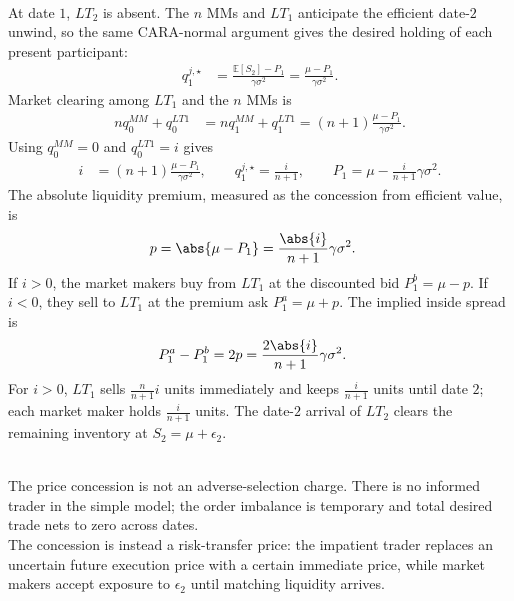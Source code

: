 \begin{model}
\par\smallskip\noindent{}\\
At date $1$, $LT_2$ is absent. The $n$ MMs and $LT_1$ anticipate the efficient date-$2$ unwind, so the same CARA-normal argument gives the desired holding of each present participant:
\begin{align*}
q_1^{j,\star}&=\frac{\mathbb{E}[S_2]-P_1}{\gamma\sigma^2}=\frac{\mu-P_1}{\gamma\sigma^2}.
\end{align*}
Market clearing among $LT_1$ and the $n$ MMs is
\begin{align*}
nq_0^{MM}+q_0^{LT1}
&=nq_1^{MM}+q_1^{LT1}=(n+1)\frac{\mu-P_1}{\gamma\sigma^2}.
\end{align*}
Using $q_0^{MM}=0$ and $q_0^{LT1}=i$ gives
\begin{align*}
i&=(n+1)\frac{\mu-P_1}{\gamma\sigma^2}, \qquad q_1^{j,\star}=\frac{i}{n+1}, \qquad P_1=\mu-\frac{i}{n+1}\gamma\sigma^2.
\end{align*}
The absolute liquidity premium, measured as the concession from efficient value, is
\begin{align*}
p&=\abs{\mu-P_1}=\frac{\abs{i}}{n+1}\gamma\sigma^2.
\end{align*}
If $i>0$, the market makers buy from $LT_1$ at the discounted bid $P_1^b=\mu-p$. If $i<0$, they sell to $LT_1$ at the premium ask $P_1^a=\mu+p$. The implied inside spread is
\begin{align*}
P_1^a-P_1^b&=2p=\frac{2\abs{i}}{n+1}\gamma\sigma^2.
\end{align*}
For $i>0$, $LT_1$ sells $\frac{n}{n+1}i$ units immediately and keeps $\frac{i}{n+1}$ units until date $2$; each market maker holds $\frac{i}{n+1}$ units. The date-$2$ arrival of $LT_2$ clears the remaining inventory at $S_2=\mu+\epsilon_2$.

\par\smallskip\noindent{}\\
The price concession is not an adverse-selection charge. There is no informed trader in the simple model; the order imbalance is temporary and total desired trade nets to zero across dates.\\
The concession is instead a risk-transfer price: the impatient trader replaces an uncertain future execution price with a certain immediate price, while market makers accept exposure to $\epsilon_2$ until matching liquidity arrives.


\end{model}
